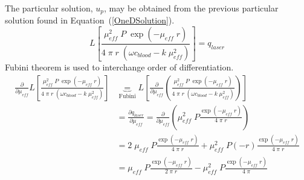 \documentclass{article}         %
\theoremstyle{definition}
\theoremstyle{remark}
\newcommand{\eqn}[1]{(\ref{#1})}
\begin{document}
The particular solution, $u_p$, may be obtained from the previous particular
solution found in Equation~\eqn{OneDSolution}.
\[
  L \left[
    \frac{\mu_\textit{eff}^2 \; P \; \exp \left(-\mu_\textit{eff} \; r \right) }
         { 4 \; \pi \; r \; \left(\omega c_\textit{blood}-k \; \mu_\textit{eff}^2 \right)} 
    \right] =q_{laser} 
\]
Fubini theorem is used to interchange order of differentiation.
\[
\begin{split}
    \frac{\partial }{\partial \mu_\textit{eff}}
  L \left[
    \frac{\mu_\textit{eff}^2 \; P \; \exp \left(-\mu_\textit{eff} \; r \right) }
         { 4 \; \pi \; r \; \left(\omega c_\textit{blood}-k \; \mu_\textit{eff}^2 \right)} 
    \right] 
  & \underbrace{
   = 
  }_\text{Fubini}
  L \left[
    \frac{\partial }{\partial \mu_\textit{eff}}
   \left(
    \frac{\mu_\textit{eff}^2 \; P \; \exp \left(-\mu_\textit{eff} \; r \right) }
         { 4 \; \pi \; r \; \left(\omega c_\textit{blood}-k \; \mu_\textit{eff}^2 \right)} 
   \right)
   \right] 
\\
  &  =
    \frac{\partial q_{laser}}{\partial \mu_\textit{eff}}
    = \frac{\partial }{\partial \mu_\textit{eff}}
   \left(
    \mu_\textit{eff}^2 \;  P
    \frac{ \exp \left(-\mu_\textit{eff} \; r \right) }{ 4 \; \pi \; r}
   \right)
\\
 & = 
   2 \; \mu_\textit{eff} \;  P
    \frac{ \exp \left(-\mu_\textit{eff} \; r \right) }{ 4 \; \pi \; r}
   + 
    \mu_\textit{eff}^2 \;  P
    \left(-r\right) \frac{ \exp \left(-\mu_\textit{eff} \; r \right) }{ 4 \; \pi \; r}
 \\
 & = 
    \mu_\textit{eff} \;  P
    \frac{ \exp \left(-\mu_\textit{eff} \; r \right) }{ 2 \; \pi \; r}
   - 
    \mu_\textit{eff}^2 \;  P
                    \frac{ \exp \left(-\mu_\textit{eff} \; r \right) }{ 4 \; \pi }
\end{split}
\]
\end{document}
